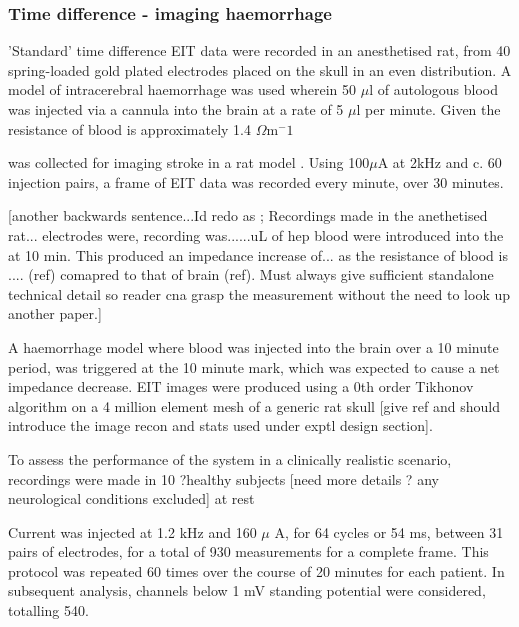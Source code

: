 \subsubsection{Time difference - imaging haemorrhage}
\label{methodsTD}
'Standard' time difference EIT data were recorded in an anesthetised rat, from 40 spring-loaded gold plated electrodes placed on the skull in an even distribution. A model of intracerebral haemorrhage was used wherein 50 $\mu$l of autologous blood was injected via a cannula into the brain at a rate of 5 $\mu$l per minute. Given the resistance of blood is approximately 1.4 $\Omega \text{m}^-1$




was collected for imaging stroke in a rat model \cite{Dowrick_2016}. Using 100\( \mu \)A at 2kHz and c. 60 injection pairs, a frame of EIT data was recorded every minute, over 30 minutes. 

[another backwards sentence...Id redo as ; Recordings made in the anethetised rat... electrodes were, recording was......uL of hep blood were introduced into the at 10 min. This produced an impedance increase of... as the resistance of blood is .... (ref) comapred to that of brain (ref). Must always give sufficient standalone technical detail so reader cna grasp the measurement without the need to look up another paper.]



A haemorrhage model where blood was injected into the brain over a 10 minute period, was triggered at the 10 minute mark, which was expected to cause a net impedance decrease. EIT images were produced using a 0th order Tikhonov algorithm on a 4 million element mesh of a generic rat skull [give ref and should introduce the image recon and stats used under exptl design section].

To assess the performance of the system in a clinically realistic scenario, recordings were made in 10 ?healthy subjects [need more details ? any neurological conditions excluded] at rest 



Current was injected at 1.2 kHz and 160 $\mu$ A, for 64 cycles or 54 ms, between 31 pairs of electrodes, for a total of 930 measurements for a complete frame. This protocol was repeated 60 times over the course of 20 minutes for each patient. In subsequent analysis, channels below 1 mV standing potential were considered, totalling 540. 